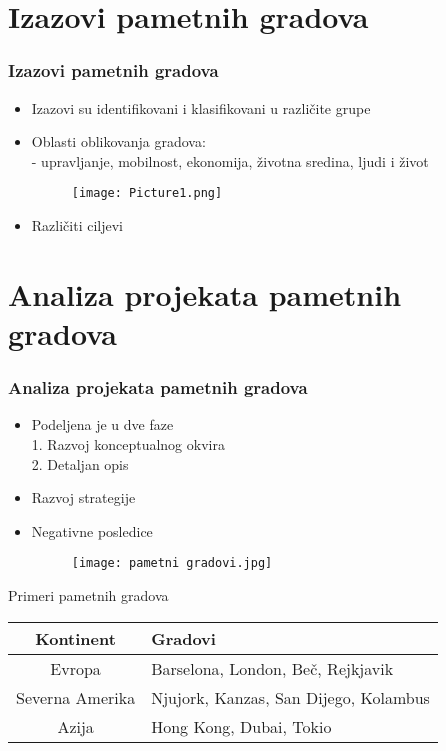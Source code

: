 \documentclass{beamer}
\begin{document}
\section{Izazovi pametnih gradova}
\begin{frame}[fragile]\frametitle{Izazovi pametnih gradova}
\begin{itemize}
    \item Izazovi su identifikovani i klasifikovani u različite grupe
    \item Oblasti oblikovanja gradova:   \\
    - upravljanje, mobilnost, ekonomija, životna sredina, ljudi i život
    \begin{figure}[h!]
        \centering\texttt{[image: Picture1.png]} 
\end{figure}
    \item Različiti ciljevi
\end{itemize}

\end{frame}



\section{Analiza projekata pametnih gradova}
\begin{frame}[fragile]\frametitle{Analiza projekata pametnih gradova}

\begin{itemize}
    \item Podeljena je u dve faze\\
    1. Razvoj konceptualnog okvira\\
    2. Detaljan opis
    \item Razvoj strategije
    \item Negativne posledice
    \begin{figure}[h!]
        \centering
        \texttt{[image: pametni gradovi.jpg]} 
\end{figure}
\end{itemize}

\end{frame}
\begin{frame}{Primeri pametnih gradova}
\begin{table}[h!]
\begin{center}
\begin{tabular}{|c|l|} \hline
\textbf{Kontinent}& \textbf{Gradovi}\\ \hline
Evropa &Barselona, London, Beč, Rejkjavik\\ \hline
Severna Amerika &Njujork, Kanzas, San Dijego, Kolambus\\ \hline
Azija &Hong Kong, Dubai, Tokio\\ \hline

\end{tabular}
\label{tab:tabela1}
\end{center}
\end{table}
\end{frame}
\end{document}
